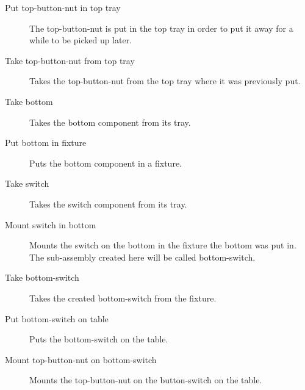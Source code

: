 \begin{description}
\item[Put top-button-nut in top tray] The top-button-nut is put in the top tray in order to put it away for a while to be picked up later.

\item[Take top-button-nut from top tray] Takes the top-button-nut from the top tray where it was previously put.

\item[Take bottom] Takes the bottom component from its tray.

\item[Put bottom in fixture] Puts the bottom component in a fixture.

\item[Take switch] Takes the switch component from its tray.

\item[Mount switch in bottom] Mounts the switch on the bottom in the fixture the bottom was put in. The sub-assembly created here will be called bottom-switch.

\item[Take bottom-switch] Takes the created bottom-switch from the fixture.

\item[Put bottom-switch on table] Puts the bottom-switch on the table.

\item[Mount top-button-nut on bottom-switch] Mounts the top-button-nut on the button-switch on the table.
\end{description}

